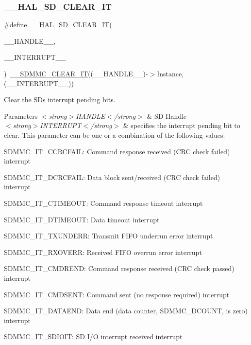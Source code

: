 \subsubsection{\texorpdfstring{\_\_HAL\_SD\_CLEAR\_IT}{\_\_HAL\_SD\_CLEAR\_IT}}
{\footnotesize\ttfamily \#define \+\_\+\+\_\+\+H\+A\+L\+\_\+\+S\+D\+\_\+\+C\+L\+E\+A\+R\+\_\+\+IT(\begin{DoxyParamCaption}\item[{}]{\+\_\+\+\_\+\+H\+A\+N\+D\+L\+E\+\_\+\+\_\+,  }\item[{}]{\+\_\+\+\_\+\+I\+N\+T\+E\+R\+R\+U\+P\+T\+\_\+\+\_\+ }\end{DoxyParamCaption})~\mbox{\hyperlink{group___s_d_m_m_c___l_l___interrupt___clock_ga86db406c85993ed8b12903ca403538f0}{\+\_\+\+\_\+\+S\+D\+M\+M\+C\+\_\+\+C\+L\+E\+A\+R\+\_\+\+IT}}((\+\_\+\+\_\+\+H\+A\+N\+D\+L\+E\+\_\+\+\_\+)-\/$>$Instance, (\+\_\+\+\_\+\+I\+N\+T\+E\+R\+R\+U\+P\+T\+\_\+\+\_\+))}



Clear the SD\textquotesingle{}s interrupt pending bits. 


\begin{DoxyParams}{Parameters}
{\em $<$strong$>$\+H\+A\+N\+D\+L\+E$<$/strong$>$} & SD Handle \\
\hline
{\em $<$strong$>$\+I\+N\+T\+E\+R\+R\+U\+P\+T$<$/strong$>$} & specifies the interrupt pending bit to clear. This parameter can be one or a combination of the following values\+: \begin{DoxyItemize}
\item S\+D\+M\+M\+C\+\_\+\+I\+T\+\_\+\+C\+C\+R\+C\+F\+A\+IL\+: Command response received (C\+RC check failed) interrupt \item S\+D\+M\+M\+C\+\_\+\+I\+T\+\_\+\+D\+C\+R\+C\+F\+A\+IL\+: Data block sent/received (C\+RC check failed) interrupt \item S\+D\+M\+M\+C\+\_\+\+I\+T\+\_\+\+C\+T\+I\+M\+E\+O\+UT\+: Command response timeout interrupt \item S\+D\+M\+M\+C\+\_\+\+I\+T\+\_\+\+D\+T\+I\+M\+E\+O\+UT\+: Data timeout interrupt \item S\+D\+M\+M\+C\+\_\+\+I\+T\+\_\+\+T\+X\+U\+N\+D\+E\+RR\+: Transmit F\+I\+FO underrun error interrupt \item S\+D\+M\+M\+C\+\_\+\+I\+T\+\_\+\+R\+X\+O\+V\+E\+RR\+: Received F\+I\+FO overrun error interrupt \item S\+D\+M\+M\+C\+\_\+\+I\+T\+\_\+\+C\+M\+D\+R\+E\+ND\+: Command response received (C\+RC check passed) interrupt \item S\+D\+M\+M\+C\+\_\+\+I\+T\+\_\+\+C\+M\+D\+S\+E\+NT\+: Command sent (no response required) interrupt \item S\+D\+M\+M\+C\+\_\+\+I\+T\+\_\+\+D\+A\+T\+A\+E\+ND\+: Data end (data counter, S\+D\+M\+M\+C\+\_\+\+D\+C\+O\+U\+NT, is zero) interrupt \item S\+D\+M\+M\+C\+\_\+\+I\+T\+\_\+\+S\+D\+I\+O\+IT\+: SD I/O interrupt received interrupt \end{DoxyItemize}
\\
\hline
\end{DoxyParams}

